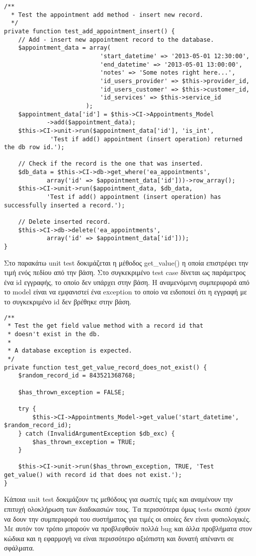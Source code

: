 \documentclass[12pt]{article}
\begin{document}
\begingroup
\fontsize{10pt}{12pt}
\begin{verbatim}
/**
  * Test the appointment add method - insert new record.
  */
private function test_add_appointment_insert() {
    // Add - insert new appointment record to the database.
    $appointment_data = array(
                           'start_datetime' => '2013-05-01 12:30:00',
                           'end_datetime' => '2013-05-01 13:00:00',
                           'notes' => 'Some notes right here...',
                           'id_users_provider' => $this->provider_id,
                           'id_users_customer' => $this->customer_id,
                           'id_services' => $this->service_id
                       );
    $appointment_data['id'] = $this->CI->Appointments_Model
            ->add($appointment_data);
    $this->CI->unit->run($appointment_data['id'], 'is_int', 
             'Test if add() appointment (insert operation) returned the db row id.');
        
    // Check if the record is the one that was inserted.
    $db_data = $this->CI->db->get_where('ea_appointments', 
            array('id' => $appointment_data['id']))->row_array();
    $this->CI->unit->run($appointment_data, $db_data, 
            'Test if add() appointment (insert operation) has successfully inserted a record.');

    // Delete inserted record.
    $this->CI->db->delete('ea_appointments', 
            array('id' => $appointment_data['id']));
}
\end{verbatim}
\endgroup
Στο παρακάτω unit test δοκιμάζεται η μέθοδος get\_value() η οποία επιστρέφει την τιμή ενός πεδίου από την βάση. Στο συγκεκριμένο test case δίνεται ως παράμετρος ένα id εγγραφής, το οποίο δεν υπάρχει στην βάση. Η αναμενόμενη συμπεριφορά από το model είναι να εμφανιστεί ένα exception το οποίο να ειδοποιεί ότι η εγγραφή με το συγκεκριμένο id δεν βρέθηκε στην βάση.

\begingroup
\fontsize{10pt}{12pt}
\begin{verbatim}
/**
 * Test the get field value method with a record id that
 * doesn't exist in the db.
 * 
 * A database exception is expected.
 */
private function test_get_value_record_does_not_exist() {
    $random_record_id = 843521368768;
        
    $has_thrown_exception = FALSE;
        
    try {
        $this->CI->Appointments_Model->get_value('start_datetime', $random_record_id);
    } catch (InvalidArgumentException $db_exc) {
        $has_thrown_exception = TRUE;
    }
        
    $this->CI->unit->run($has_thrown_exception, TRUE, 'Test get_value() with record id that does not exist.');
}
\end{verbatim}
\endgroup

Κάποια unit test δοκιμάζουν τις μεθόδους για σωστές τιμές και αναμένουν την επιτυχή ολοκλήρωση των διαδικασιών τους. Τα περισσότερα όμως tests σκοπό έχουν να δουν την συμπεριφορά του συστήματος για τιμές οι οποίες δεν είναι φυσιολογικές. Με αυτόν τον τρόπο μπορούν να προβλεφθούν πολλά bug και άλλα προβλήματα στον κώδικα και η εφαρμογή να είναι περισσότερο αξιόπιστη και δυνατή απέναντι σε σφάλματα.
\end{document}
